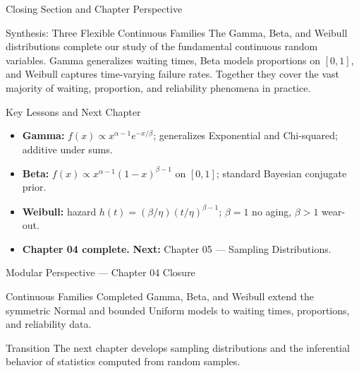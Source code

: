 \documentclass[aspectratio=169,xcolor={dvipsnames,table}]{beamer}
\begin{document}
\begin{frame}{Closing Section and Chapter Perspective}
	\vspace{-0.2cm}
	\begin{block}{Synthesis: Three Flexible Continuous Families}
		\scriptsize
		The Gamma, Beta, and Weibull distributions complete our study of the fundamental continuous random variables. Gamma generalizes waiting times, Beta models proportions on $[0,1]$, and Weibull captures time-varying failure rates. Together they cover the vast majority of waiting, proportion, and reliability phenomena in practice.
	\end{block}
	\vspace{0.05cm}
	\pause
	\begin{alertblock}{Key Lessons and Next Chapter}
		\begin{itemize}\itemsep=0.05cm
			\item \textbf{Gamma:} $f(x) \propto x^{\alpha-1}e^{-x/\beta}$; generalizes Exponential and Chi-squared; additive under sums.
			\item \textbf{Beta:} $f(x) \propto x^{\alpha-1}(1-x)^{\beta-1}$ on $[0,1]$; standard Bayesian conjugate prior.
			\item \textbf{Weibull:} hazard $h(t) = (\beta/\eta)(t/\eta)^{\beta-1}$; $\beta=1$ no aging, $\beta>1$ wear-out.
			\item \textbf{Chapter 04 complete.} \textbf{Next:} \textcolor{TecRojo}{Chapter 05 --- Sampling Distributions}.
		\end{itemize}
	\end{alertblock}
\end{frame}

\begin{frame}{Modular Perspective --- Chapter 04 Closure}
\scriptsize
\begin{alertblock}{Continuous Families Completed}
Gamma, Beta, and Weibull extend the symmetric Normal and bounded Uniform models
to waiting times, proportions, and reliability data.
\end{alertblock}
\begin{block}{Transition}
The next chapter develops sampling distributions and the inferential behavior of
statistics computed from random samples.
\end{block}
\end{frame}
\end{document}
